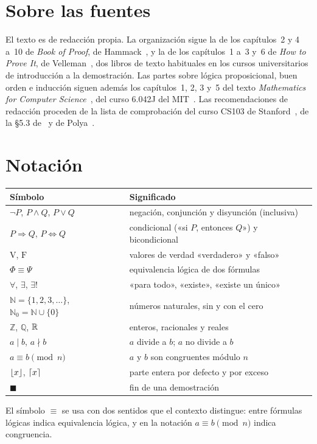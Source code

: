 \documentclass[11pt,a4paper,twoside,openany]{book}
\newcommand{\N}{\mathbb{N}}
\newcommand{\Z}{\mathbb{Z}}
\newcommand{\Q}{\mathbb{Q}}
\renewcommand{\V}{\mathrm{V}}%
\newcommand{\F}{\mathrm{F}}
\newcommand{\divides}{\mid}
\newcommand{\nodivide}{\nmid}
\newcommand{\eqlog}{\equiv}
\DeclarePairedDelimiter{\floor}{\lfloor}{\rfloor}
\DeclarePairedDelimiter{\ceil}{\lceil}{\rceil}
\begin{document}
\section*{Sobre las fuentes}
El texto es de redacción propia. La organización sigue la de los capítulos~2 y 4 a~10 de \emph{Book of Proof}, de Hammack~\cite{hammack}, y la de los capítulos~1 a~3 y~6 de \emph{How to Prove It}, de Velleman~\cite{velleman}, dos libros de texto habituales en los cursos universitarios de introducción a la demostración. Las partes sobre lógica proposicional, buen orden e inducción siguen además los capítulos~1, 2, 3 y~5 del texto \emph{Mathematics for Computer Science}~\cite{mcs}, del curso 6.042J del MIT~\cite{mit6042}. Las recomendaciones de redacción proceden de la lista de comprobación del curso CS103 de Stanford~\cite{cs103}, de la §5.3 de~\cite{hammack} y de Polya~\cite{polya}.

\section*{Notación}
\begin{center}
\begin{tabular}{@{}ll@{}}
\toprule
Símbolo & Significado \\
\midrule
$\neg P$, $P\wedge Q$, $P\vee Q$ & negación, conjunción y disyunción (inclusiva) \\
$P\Rightarrow Q$, $P\Leftrightarrow Q$ & condicional («si $P$, entonces $Q$») y bicondicional \\
$\V$, $\F$ & valores de verdad «verdadero» y «falso» \\
$\Phi\eqlog\Psi$ & equivalencia lógica de dos fórmulas \\
$\forall$, $\exists$, $\exists!$ & «para todo», «existe», «existe un único» \\
$\N=\{1,2,3,\dots\}$, $\N_0=\N\cup\{0\}$ & números naturales, sin y con el cero \\
$\Z$, $\Q$, $\mathbb{R}$ & enteros, racionales y reales \\
$a\divides b$, $a\nodivide b$ & $a$ divide a $b$; $a$ no divide a $b$ \\
$a\equiv b\pmod n$ & $a$ y $b$ son congruentes módulo $n$ \\
$\floor{x}$, $\ceil{x}$ & parte entera por defecto y por exceso \\
$\blacksquare$ & fin de una demostración \\
\bottomrule
\end{tabular}
\end{center}
El símbolo $\equiv$ se usa con dos sentidos que el contexto distingue: entre fórmulas lógicas indica equivalencia lógica, y en la notación $a\equiv b\pmod n$ indica congruencia.

\tableofcontents

\mainmatter







\appendix


\backmatter

\end{document}
